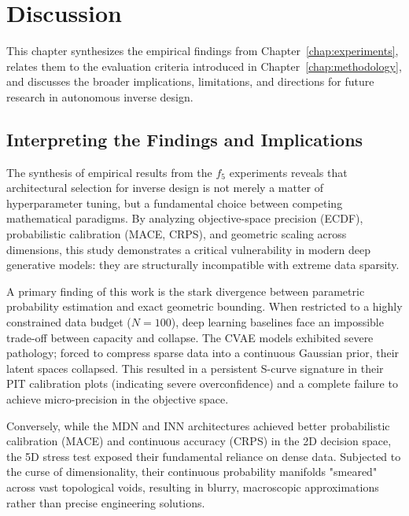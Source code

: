 
\chapter{Discussion}\label{chap:discussion}

This chapter synthesizes the empirical findings from Chapter~\ref{chap:experiments}, relates them to the evaluation criteria introduced in Chapter~\ref{chap:methodology}, and discusses the broader implications, limitations, and directions for future research in autonomous inverse design.

\section{Interpreting the Findings and Implications}\label{sec:discussion_interpretation}

The synthesis of empirical results from the $f_5$ experiments reveals that architectural selection for inverse design is not merely a matter of hyperparameter tuning, but a fundamental choice between competing mathematical paradigms. By analyzing objective-space precision (ECDF), probabilistic calibration (MACE, CRPS), and geometric scaling across dimensions, this study demonstrates a critical vulnerability in modern deep generative models: they are structurally incompatible with extreme data sparsity.

A primary finding of this work is the stark divergence between parametric probability estimation and exact geometric bounding. When restricted to a highly constrained data budget ($N=100$), deep learning baselines face an impossible trade-off between capacity and collapse. The CVAE models exhibited severe pathology; forced to compress sparse data into a continuous Gaussian prior, their latent spaces collapsed. This resulted in a persistent S-curve signature in their PIT calibration plots (indicating severe overconfidence) and a complete failure to achieve micro-precision in the objective space. 

Conversely, while the MDN and INN architectures achieved better probabilistic calibration (MACE) and continuous accuracy (CRPS) in the 2D decision space, the 5D stress test exposed their fundamental reliance on dense data. Subjected to the curse of dimensionality, their continuous probability manifolds "smeared" across vast topological voids, resulting in blurry, macroscopic approximations rather than precise engineering solutions.

